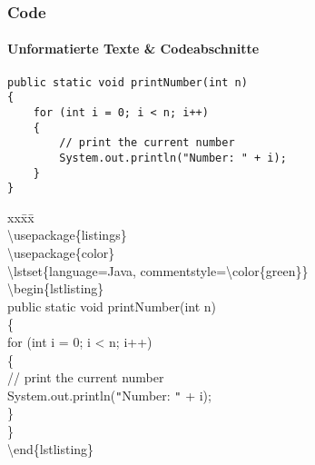 \begin{frame}[fragile]
\frametitle{Code}
\framesubtitle{Unformatierte Texte \& Codeabschnitte}
\vspace{3mm}
\scriptsize
{}
\begin{lstlisting}
public static void printNumber(int n)
{
    for (int i = 0; i < n; i++)
    {
        // print the current number
        System.out.println("Number: " + i);
    }
}
\end{lstlisting}

\footnotesize
\vspace{-2mm}


\begin{ttfamily}
\begin{tabbing}
xx\=xx\=\kill\\
\color{nounibaredI}\textbackslash usepackage\color{black}\{listings\}\\
\color{nounibaredI}\textbackslash usepackage\color{black}\{color\}\\
\color{nounibaredI}\textbackslash lstset\color{black}\{language=Java, commentstyle=\color{nounibaredI}\textbackslash color\color{black}\{green\}\}\\
\color{unibablueI}\textbackslash begin\color{black}\{lstlisting\}\\
public static void printNumber(int n)\\
\{\\
\>for (int i = 0; i < n; i++)\\
\>\{\\
\>\>// print the current number\\
\>\>System.out.println(\verb|"|Number: \verb|"| + i);\\
\>\}\\
\}\\
\color{unibablueI}\textbackslash end\color{black}\{lstlisting\}\\
\end{tabbing}
\end{ttfamily}
\normalsize
\end{frame}




